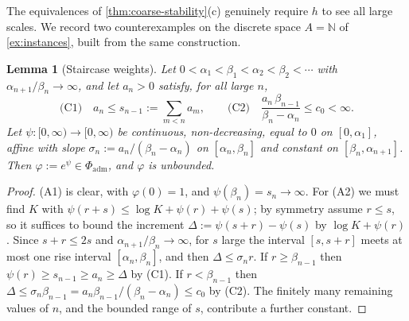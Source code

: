 \documentclass[11pt,a4paper]{article}
\numberwithin{equation}{section}
\theoremstyle{plain}
\newtheorem{lemma}[theorem]{Lemma}
\theoremstyle{definition}
\theoremstyle{remark}
\newcommand{\N}{\mathbb{N}}
\begin{document}
The equivalences of \cref{thm:coarse-stability}(c) genuinely require $h$ to see all large
scales. We record two counterexamples on the discrete space $A=\N$ of
\cref{ex:instances}, built from the same construction.

\begin{lemma}[Staircase weights]\label{lem:staircase}
Let $0<\alpha_1<\beta_1<\alpha_2<\beta_2<\cdots$ with $\alpha_{n+1}/\beta_n\to\infty$, and
let $a_n>0$ satisfy, for all large $n$,
\[
\text{(C1)}\quad a_n\le s_{n-1}:=\sum_{m<n}a_m,
\qquad
\text{(C2)}\quad \frac{a_n\,\beta_{n-1}}{\beta_n-\alpha_n}\le c_0<\infty .
\]
Let $\psi:[0,\infty)\to[0,\infty)$ be continuous, non-decreasing, equal to $0$ on
$[0,\alpha_1]$, affine with slope $\sigma_n:=a_n/(\beta_n-\alpha_n)$ on $[\alpha_n,\beta_n]$
and constant on $[\beta_n,\alpha_{n+1}]$. Then $\varphi:=e^{\psi}\in\Phi_{\mathrm{adm}}$,
and $\varphi$ is unbounded.
\end{lemma}

\begin{proof}
(A1) is clear, with $\varphi(0)=1$, and $\psi(\beta_n)=s_n\to\infty$. For (A2) we must find
$K$ with $\psi(r+s)\le\log K+\psi(r)+\psi(s)$; by symmetry assume $r\le s$, so it suffices
to bound the increment $\Delta:=\psi(s+r)-\psi(s)$ by $\log K+\psi(r)$. Since
$s+r\le2s$ and $\alpha_{n+1}/\beta_n\to\infty$, for $s$ large the interval $[s,s+r]$ meets
at most one rise interval $[\alpha_n,\beta_n]$, and then $\Delta\le\sigma_n r$. If
$r\ge\beta_{n-1}$ then $\psi(r)\ge s_{n-1}\ge a_n\ge\Delta$ by (C1). If $r<\beta_{n-1}$
then $\Delta\le\sigma_n\beta_{n-1}=a_n\beta_{n-1}/(\beta_n-\alpha_n)\le c_0$ by (C2). The
finitely many remaining values of $n$, and the bounded range of $s$, contribute a further
constant.
\end{proof}
\end{document}
